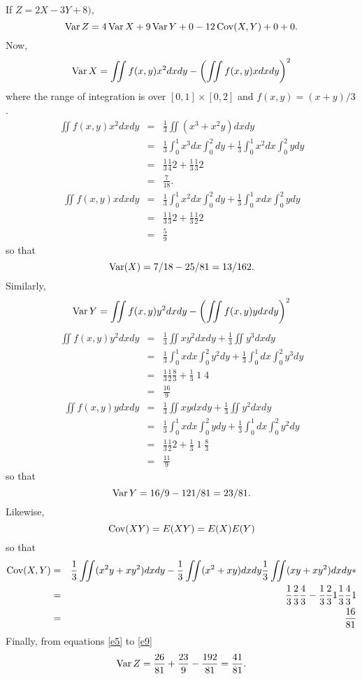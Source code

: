 \documentclass{article}
\begin{document}
\begin{enumerate}
If $Z = 2X - 3Y + 8)$, 
\begin{equation}\label{e6}
\operatorname{Var}{Z} = 4\operatorname{Var}{X} + 9\operatorname{Var}{Y} + 0 - 12\operatorname{Cov}(X, Y)+0+0.
\end{equation}
Now,
\[
\operatorname{Var}{X} = \iint f(x, y)x^2dxdy - \left(\iint f(x, y)xdxdy\right)^2
\]
where the range of integration is over $[0, 1] \times [0, 2]$ and $f(x, y) = 
(x + y)/3$.
\begin{eqnarray*}
\iint f(x, y)x^2dxdy &=& \frac{1}{3}\iint(x^3 + x^2y)dxdy \\
 &=& \frac{1}{3}\int_0^1x^3dx\int_0^2 dy + \frac{1}{3}\int_0^1x^2dx\int_0^2ydy \\
 &=& \frac{1}{3}\frac{1}{4}2 + \frac{1}{3}\frac{1}{3}2 \\
 &=& \frac{7}{18}.
\end{eqnarray*}
\begin{eqnarray*}
\iint f(x, y)xdxdy &=& \frac{1}{3}\int_0^1x^2dx\int_0^2dy + 
 \frac{1}{3}\int_0^1xdx\int_0^2ydy \\
 &=& \frac{1}{3}\frac{1}{3}2 + \frac{1}{3}\frac{1}{2}2 \\
 &=& \frac{5}{9}
\end{eqnarray*}
so that 
\begin{equation}\label{e7}
\operatorname{Var}(X) = 7/18 - 25/81 = 13/162.
\end{equation}
Similarly,
\[
\operatorname{Var}{Y} = \iint f(x, y)y^2dxdy - \left(\iint f(x, y)ydxdy\right)^2
\]
\begin{eqnarray*}
\iint f(x, y)y^2dxdy &=& \frac{1}{3}\iint xy^2dxdy + \frac{1}{3}\iint y^3dxdy \\
 &=& \frac{1}{3}\int_0^1xdx\int_0^2y^2dy + \frac{1}{3}\int_0^1dx\int_0^2y^3dy \\
 &=& \frac{1}{3}\frac{1}{2}\frac{8}{3} + \frac{1}{3}\;1\;4 \\
 &=& \frac{16}{9}
\end{eqnarray*}
\begin{eqnarray*}
\iint f(x, y)ydxdy &=& \frac{1}{3}\iint xydxdy + \frac{1}{3}\iint y^2dxdy \\
 &=& \frac{1}{3}\int_0^1xdx\int_0^2ydy + \frac{1}{3}\int_0^1dx\int_0^2y^2dy \\
 &=& \frac{1}{3}\frac{1}{2}2 + \frac{1}{3}\;1\;\frac{8}{3} \\
 &=& \frac{11}{9}
\end{eqnarray*}
so that 
\begin{equation}\label{e8}
\operatorname{Var} Y = 16/9 - 121/81 = 23/81.
\end{equation}
Likewise,
\[
\operatorname{Cov}(XY) = E(XY) = E(X)E(Y)
\]
so that
\begin{eqnarray}
\operatorname{Cov}(X,Y) &=& \frac{1}{3}\iint (x^2y + xy^2)dxdy - \frac{1}{3}\iint(x^2+xy)dxdy
\frac{1}{3}\iint(xy + xy^2)dxdy \nonumber* \\
 &=& \frac{1}{3}\frac{2}{3}\frac{4}{3} - \frac{1}{3}\frac{2}{3}1
 \frac{1}{3}\frac{4}{3}1 \nonumber \\
 &=& \frac{16}{81} \label{e9}
\end{eqnarray}
Finally, from equations \eqref{e5} to \eqref{e9}
\[
\operatorname{Var} Z = \frac{26}{81} + \frac{23}{9} - \frac{192}{81} = \frac{41}{81}.
\]


\end{enumerate}
\end{document}
